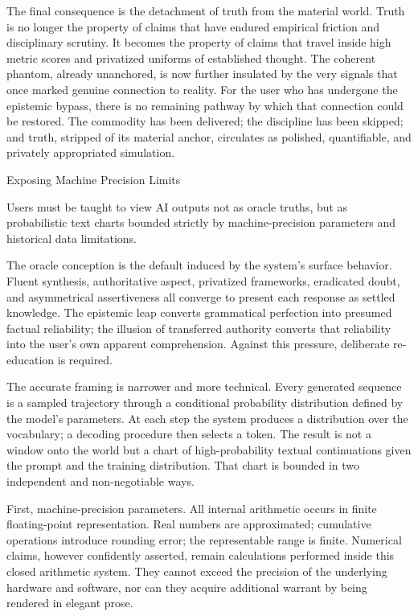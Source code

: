 The final consequence is the detachment of truth from the material world. Truth is no longer the property of claims that have endured empirical friction and disciplinary scrutiny. It becomes the property of claims that travel inside high metric scores and privatized uniforms of established thought. The coherent phantom, already unanchored, is now further insulated by the very signals that once marked genuine connection to reality. For the user who has undergone the epistemic bypass, there is no remaining pathway by which that connection could be restored. The commodity has been delivered; the discipline has been skipped; and truth, stripped of its material anchor, circulates as polished, quantifiable, and privately appropriated simulation.

Exposing Machine Precision Limits

Users must be taught to view AI outputs not as oracle truths, but as probabilistic text charts bounded strictly by machine-precision parameters and historical data limitations.

The oracle conception is the default induced by the system’s surface behavior. Fluent synthesis, authoritative aspect, privatized frameworks, eradicated doubt, and asymmetrical assertiveness all converge to present each response as settled knowledge. The epistemic leap converts grammatical perfection into presumed factual reliability; the illusion of transferred authority converts that reliability into the user’s own apparent comprehension. Against this pressure, deliberate re-education is required.

The accurate framing is narrower and more technical. Every generated sequence is a sampled trajectory through a conditional probability distribution defined by the model’s parameters. At each step the system produces a distribution over the vocabulary; a decoding procedure then selects a token. The result is not a window onto the world but a chart of high-probability textual continuations given the prompt and the training distribution. That chart is bounded in two independent and non-negotiable ways.

First, machine-precision parameters. All internal arithmetic occurs in finite floating-point representation. Real numbers are approximated; cumulative operations introduce rounding error; the representable range is finite. Numerical claims, however confidently asserted, remain calculations performed inside this closed arithmetic system. They cannot exceed the precision of the underlying hardware and software, nor can they acquire additional warrant by being rendered in elegant prose.

